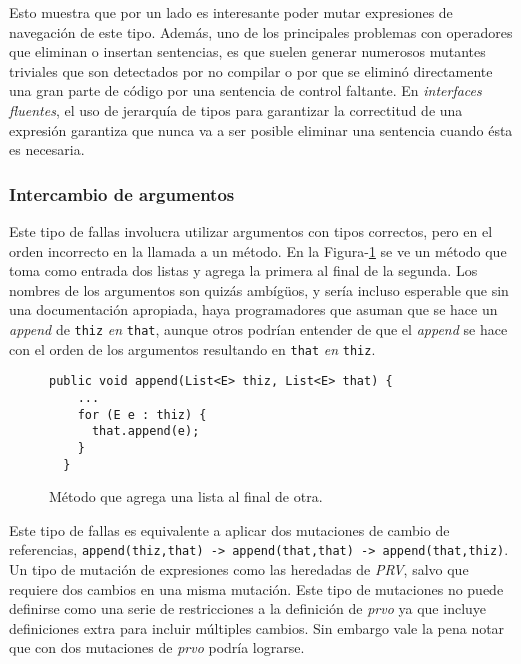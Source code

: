 Esto muestra que por un lado es interesante poder mutar expresiones de navegaci\'on de este tipo. Adem\'as, uno de los principales problemas con operadores que eliminan o insertan sentencias, es que suelen generar numerosos mutantes triviales que son detectados por no compilar o por que se elimin\'o directamente una gran parte de c\'odigo por una sentencia de control faltante. En \emph{interfaces fluentes}, el uso de jerarqu\'ia de tipos para garantizar la correctitud de una expresi\'on garantiza que nunca va a ser posible eliminar una sentencia cuando \'esta es necesaria.

\subsubsection{Intercambio de argumentos}

Este tipo de fallas involucra utilizar argumentos con tipos correctos, pero en el orden incorrecto en la llamada a un m\'etodo. En la Figura-\ref{figures.examples.argumentSwap.example1} se ve un m\'etodo que toma como entrada dos listas y agrega la primera al final de la segunda. Los nombres de los argumentos son quiz\'as amb\'ig\"{u}os, y ser\'ia incluso esperable que sin una documentaci\'on apropiada, haya programadores que asuman que se hace un \emph{append} de \texttt{thiz} \emph{en} \texttt{that}, aunque otros podr\'ian entender de que el \emph{append} se hace con el orden de los argumentos resultando en \texttt{that} \emph{en} \texttt{thiz}. 

\begin{figure}
	\begin{lstlisting}[frame=single, mathescape=true,framexleftmargin=1.5em]
  public void append(List<E> thiz, List<E> that) {
    ...
    for (E e : thiz) {
      that.append(e);
    }
  }
	\end{lstlisting}
	\caption{M\'etodo que agrega una lista al final de otra.}
	\label{figures.examples.argumentSwap.example1}
\end{figure}

Este tipo de fallas es equivalente a aplicar dos mutaciones de cambio de referencias, \lstinline|append(thiz,that) -> append(that,that) -> append(that,thiz)|. Un tipo de mutaci\'on de expresiones como las heredadas de \emph{PRV}, salvo que requiere dos cambios en una misma mutaci\'on. Este tipo de mutaciones no puede definirse como una serie de restricciones a la definici\'on de \emph{prvo} ya que incluye definiciones extra para incluir m\'ultiples cambios. Sin embargo vale la pena notar que con dos mutaciones de \emph{prvo} podr\'ia lograrse.

